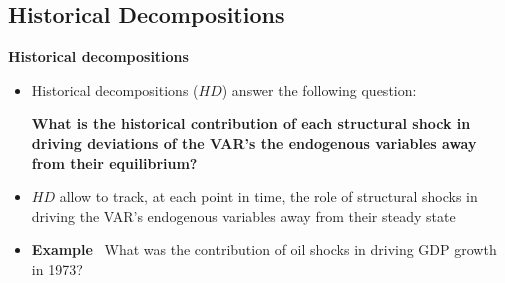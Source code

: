 \documentclass[10pt,english,t,aspectratio=169,ignorenonframetext]{beamer}
\begin{document}

\subsection{Historical Decompositions}

\begin{frame}
\vspace{3cm} \color{title}\bigskip

\color{note}
\end{frame}


\begin{frame}
{\textbf{Historical decompositions}}\bigskip \bigskip

\begin{itemize}
\item Historical decompositions ($HD$) answer the following question:\bigskip

\textbf{What is the historical contribution of each structural shock in
driving deviations of the VAR's the endogenous variables away from their
equilibrium?}\bigskip \medskip \pause

\item $HD$ allow to track, at each point in time, the role of structural
shocks in driving the VAR's endogenous variables away from their steady
state\bigskip \medskip

\item \textbf{Example} \ What was the contribution of oil shocks in driving
GDP growth in 1973?
\end{itemize}
\end{frame}

\end{document}
